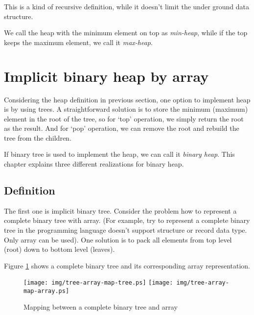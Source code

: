 \documentclass{article}
\begin{document}
This is a kind of recursive definition, while it doesn't limit the under
ground data structure.

We call the heap with the minimum element on top as {\em min-heap},
while if the top keeps the maximum element, we call it {\em max-heap}.

\section{Implicit binary heap by array}
\label{ibheap}

Considering the heap definition in previous section, one option to
implement heap is by using trees. A straightforward solution is
to store the minimum (maximum) element in the root of the
tree, so for `top' operation, we simply return the root as the
result. And for `pop' operation, we can remove the root and
rebuild the tree from the children.

If binary tree is used to implement the heap, we
can call it {\em binary heap}. This chapter explains three different
realizations for binary heap.

\subsection{Definition}

The first one is implicit binary tree. Consider the problem
how to represent a complete binary tree with array. (For example, try to
represent a complete binary tree in the programming language doesn't support structure
or record data type. Only array can be used). One solution
is to pack all elements from top level (root) down to bottom level (leaves).

Figure \ref{fig:tree-array-map} shows a complete binary tree and
its corresponding array representation.

\begin{figure}[htbp]
       \begin{center}
       	  \texttt{[image: img/tree-array-map-tree.ps]}
          \texttt{[image: img/tree-array-map-array.ps]}
        \caption{Mapping between a complete binary tree and array} \label{fig:tree-array-map}
       \end{center}
\end{figure}
\end{document}
